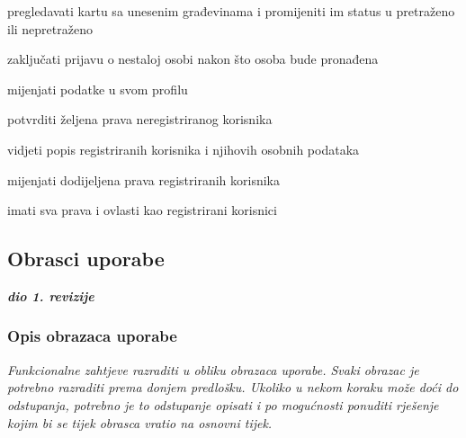 \begin{packed_enum}
\begin{packed_enum}
					
				\end{packed_enum}
				
				\item  {}
				
				\begin{packed_enum}
					
					\item pregledavati kartu sa unesenim građevinama i promijeniti im status u pretraženo ili nepretraženo
					\item zaključati prijavu o nestaloj osobi nakon što osoba bude pronađena
					\item mijenjati podatke u svom profilu

				
				\end{packed_enum}
				
				\item  {}
				
				\begin{packed_enum}
					
					\item potvrditi željena prava neregistriranog korisnika
					\item vidjeti popis registriranih korisnika i njihovih osobnih podataka
					\item mijenjati dodijeljena prava registriranih korisnika
					\item imati sva prava i ovlasti kao registrirani korisnici

				
				\end{packed_enum}
				
				
				
			\end{packed_enum}
			
			
			\eject 
			
			
				
			\subsection{Obrasci uporabe}
				
				\textbf{\textit{dio 1. revizije}}
				
				\subsubsection{Opis obrazaca uporabe}
					\textit{Funkcionalne zahtjeve razraditi u obliku obrazaca uporabe. Svaki obrazac je potrebno razraditi prema donjem predlošku. Ukoliko u nekom koraku može doći do odstupanja, potrebno je to odstupanje opisati i po mogućnosti ponuditi rješenje kojim bi se tijek obrasca vratio na osnovni tijek.}\\
					


